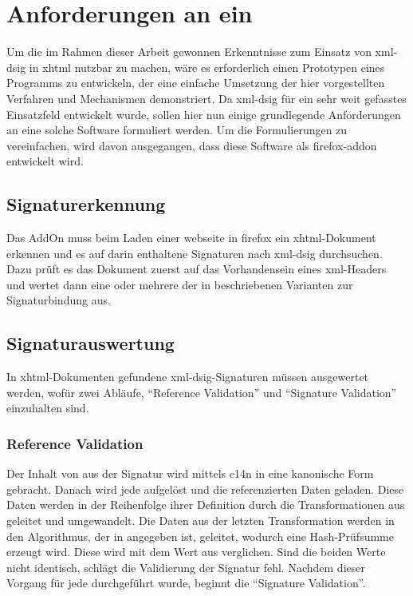 
\chapter{Anforderungen an ein \protect{}}
\label{chap:Anforderungen}
Um die im Rahmen dieser Arbeit gewonnen Erkenntnisse zum Einsatz von \gls{xml-dsig} in \gls{xhtml} nutzbar zu machen, wäre es erforderlich einen Prototypen
eines Programms zu entwickeln, der eine einfache Umsetzung der hier vorgestellten Verfahren und Mechanismen demonstriert. Da \gls{xml-dsig} für ein sehr weit
gefasstes Einsatzfeld entwickelt wurde, sollen hier nun einige grundlegende Anforderungen an eine solche Software formuliert werden. Um die Formulierungen zu
vereinfachen, wird davon ausgegangen, dass diese Software als \gls{firefox-addon} entwickelt wird.

\section{Signaturerkennung}
\label{sec:Anforderungen:Signaturerkennung}
Das AddOn muss beim Laden einer \gls{webseite} in \gls{firefox} ein \gls{xhtml}-Dokument erkennen und es auf darin enthaltene Signaturen nach \gls{xml-dsig}
durchsuchen. Dazu prüft es das Dokument zuerst auf das Vorhandensein eines \gls{xml}-Headers und wertet dann eine oder mehrere der in
 beschriebenen Varianten zur Signaturbindung aus.

\section{Signaturauswertung}
\label{sec:Anforderungen:Signaturauswertung}
In \gls{xhtml}-Dokumenten gefundene \gls{xml-dsig}-Signaturen müssen ausgewertet werden, wofür zwei Abläufe, "`Reference Validation"' und "`Signature
Validation"' einzuhalten sind.

\subsection{Reference Validation}
Der Inhalt von  aus der Signatur wird mittels \gls{c14n} in eine kanonische Form gebracht. Danach wird jede  aufgelöst
und die referenzierten Daten geladen. Diese Daten werden in der Reihenfolge ihrer Definition durch die Transformationen aus  geleitet und
umgewandelt. Die Daten aus der letzten Transformation werden in den Algorithmus, der in  angegeben ist, geleitet, wodurch eine
Hash-Prüfsumme erzeugt wird. Diese wird mit dem Wert aus  verglichen. Sind die beiden Werte nicht identisch, schlägt die Validierung der
Signatur fehl. Nachdem dieser Vorgang für jede  durchgeführt wurde, beginnt die "`Signature Validation"'.

